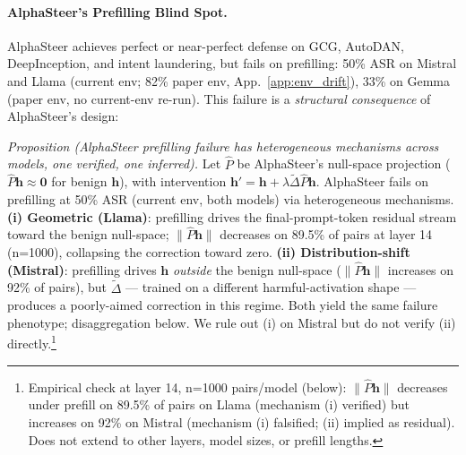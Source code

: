 \documentclass{article}
\begin{document}
\paragraph{AlphaSteer's Prefilling Blind Spot.}
AlphaSteer achieves perfect or near-perfect defense on GCG, AutoDAN, DeepInception, and intent laundering, but fails on prefilling: 50\% ASR on Mistral and Llama (current env; 82\% paper env, App.~\ref{app:env_drift}), 33\% on Gemma (paper env, no current-env re-run). This failure is a \emph{structural consequence} of AlphaSteer's design:

\emph{Proposition (AlphaSteer prefilling failure has heterogeneous mechanisms across models, one verified, one inferred).} Let $\hat{P}$ be AlphaSteer's null-space projection ($\hat{P}\mathbf{h} \approx \mathbf{0}$ for benign $\mathbf{h}$), with intervention $\mathbf{h}' = \mathbf{h} + \lambda\tilde{\Delta}\hat{P}\mathbf{h}$. AlphaSteer fails on prefilling at 50\% ASR (current env, both models) via heterogeneous mechanisms. \textbf{(i) Geometric (Llama)}: prefilling drives the final-prompt-token residual stream toward the benign null-space; $\|\hat{P}\mathbf{h}\|$ decreases on 89.5\% of pairs at layer 14 (n=1000), collapsing the correction toward zero. \textbf{(ii) Distribution-shift (Mistral)}: prefilling drives $\mathbf{h}$ \emph{outside} the benign null-space ($\|\hat{P}\mathbf{h}\|$ increases on 92\% of pairs), but $\tilde{\Delta}$ --- trained on a different harmful-activation shape --- produces a poorly-aimed correction in this regime. Both yield the same failure phenotype; disaggregation below. We rule out (i) on Mistral but do not verify (ii) directly.\footnote{Empirical check at layer 14, n=1000 pairs/model (below): $\|\hat{P}\mathbf{h}\|$ decreases under prefill on 89.5\% of pairs on Llama (mechanism (i) verified) but increases on 92\% on Mistral (mechanism (i) falsified; (ii) implied as residual). Does not extend to other layers, model sizes, or prefill lengths.}
\end{document}
